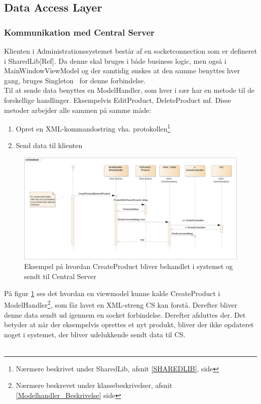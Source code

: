 \subsection{Data Access Layer}




\subsubsection{Kommunikation med Central Server}
Klienten i Administrationssystemet består af en socketconnection som er defineret i SharedLib[Ref]. Da denne skal bruges i både business logic, men også i MainWindowViewModel og der samtidig ønskes at den samme benyttes hver gang, bruges Singleton~\cite{SINGLETON} for denne forbindelse. \\
Til at sende data benyttes en ModelHandler, som hver i sær har en metode til de forskellige handlinger. Eksempelvis EditProduct, DeleteProduct mf. Disse metoder arbejder alle sammen på samme måde:
\begin{enumerate}
\item Opret en XML-kommandostring vha. protokollen\footnote{Nærmere beskrivet under SharedLib, afsnit \ref{SHAREDLIB}, side \pageref{SHAREDLIB}}
\item Send data til klienten
\end{enumerate}


\begin{figure}[!h]
    \centering
    \includegraphics[width=1\textwidth]{Systemdesign/backend/Images/DataSend.png}
    \caption{Eksempel på hvordan CreateProduct bliver behandlet i systemet og sendt til Central Server}
    \label{fig:CreateSend}
\end{figure}

På figur \ref{fig:CreateSend} ses det hvordan en viewmodel kunne kalde CreateProduct i ModelHandler\footnote{Nærmere beskrevet under klassebeskrivelser, afsnit \ref{Modelhandler_Beskrivelse} side \pageref{Modelhandler_Beskrivelse}}, som får lavet en XML-streng \gls{CS} kan forstå. Derefter bliver denne data sendt ud igennem en socket forbindelse.
Derefter afsluttes der. Det betyder at når der eksempelvis oprettes et nyt produkt, bliver der ikke opdateret noget i systemet, der bliver udelukkende sendt data til \gls{CS}.\\\\


